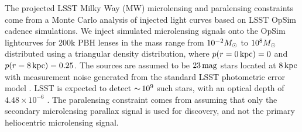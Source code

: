 The projected LSST Milky Way (MW) microlensing and paralensing constraints come from a Monte Carlo analysis of injected light curves based on LSST OpSim cadence simulations.
We inject simulated microlensing signals onto the OpSim lightcurves for 200k PBH lenses in the mass range from $10^{-2}M_\odot$ to $10^{8}M_\odot$ distributed using a triangular density distribution, where $p(r = 0 \mathrm{\,kpc}) = 0$ and $p(r = 8\mathrm{\,kpc}) = 0.25$.
The sources are assumed to be $23\mathrm{\,mag}$ stars located at $8\mathrm{\,kpc}$ with measurement noise generated from the standard LSST photometric error model \citep{0805.2366}.
LSST is expected to detect $ {\sim}\, 10^{9}$ such stars, with an optical depth of $4.48 \times 10^{-6}$ \citep{2006ApJ...636..240S}.
The paralensing constraint comes from assuming that only the secondary microlensing parallax signal is used for discovery, and not the primary heliocentric microlensing signal.


